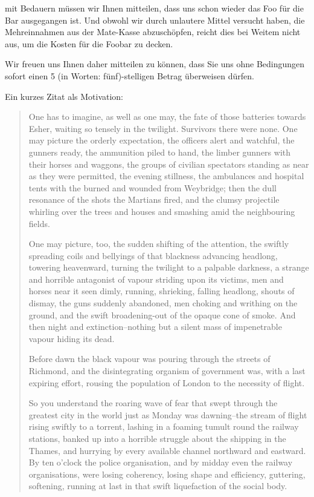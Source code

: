 \documentclass[12pt,ngerman,latin9,a4paper]{g-brief-ntz39lg19_exp}
\begin{document}
\begin{g-brief}

mit Bedauern m\"ussen wir Ihnen mitteilen, dass uns schon wieder das Foo f\"ur die Bar ausgegangen ist. Und obwohl wir durch unlautere Mittel versucht haben, die Mehreinnahmen aus der Mate-Kasse abzusch\"opfen, reicht dies bei Weitem nicht aus, um die Kosten f\"ur die Foobar zu decken.

Wir freuen uns Ihnen daher mitteilen zu k\"onnen, dass Sie uns ohne Bedingungen sofort einen 5 (in Worten: f\"unf)-stelligen Betrag \"uberweisen d\"urfen.

Ein kurzes Zitat als Motivation:

\begin{quote}
One has to imagine, as well as one may, the fate of those batteries towards Esher, waiting so tensely in the twilight.  Survivors there were none.  One may picture the orderly expectation, the officers alert and watchful, the gunners ready, the ammunition piled to hand, the limber gunners with their horses and waggons, the groups of civilian spectators standing as near as they were permitted, the evening stillness, the ambulances and hospital tents with the burned and wounded from Weybridge; then the dull resonance of the shots the Martians fired, and the clumsy projectile whirling over the trees and houses and smashing amid the neighbouring fields.

One may picture, too, the sudden shifting of the attention, the swiftly spreading coils and bellyings of that blackness advancing headlong, towering heavenward, turning the twilight to a palpable darkness, a strange and horrible antagonist of vapour striding upon its victims, men and horses near it seen dimly, running, shrieking, falling headlong, shouts of dismay, the guns suddenly abandoned, men choking and writhing on the ground, and the swift broadening-out of the opaque cone of smoke.  And then night and extinction--nothing but a silent mass of impenetrable vapour hiding its dead.

Before dawn the black vapour was pouring through the streets of Richmond, and the disintegrating organism of government was, with a last expiring effort, rousing the population of London to the necessity of flight.

So you understand the roaring wave of fear that swept through the greatest city in the world just as Monday was dawning--the stream of flight rising swiftly to a torrent, lashing in a foaming tumult round the railway stations, banked up into a horrible struggle about the shipping in the Thames, and hurrying by every available channel northward and eastward.  By ten o'clock the police organisation, and by midday even the railway organisations, were losing coherency, losing shape and efficiency, guttering, softening, running at last in that swift liquefaction of the social body.


\end{quote}
\end{g-brief}
\end{document}
